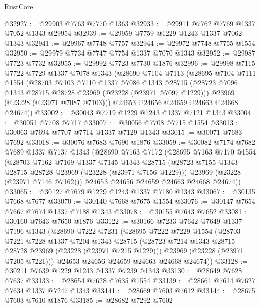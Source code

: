 \begin{lexlean}{RustCore}
\begin{coremodule}
@32927 := @29903 @7763 @7770 @1363
@32933 := @29911 @7762 @7769 @1337 @7052 @1343 @29954
@32939 := @29959 @7759 @1229 @1243 @1337 @7062 @1343
@32941 := @29967 @7748 @7757
@32944 := @29972 @7748 @7755 @1554
@32950 := @29979 @7734 @7747 @7754 @1337 @7070 @1343
@32952 := @29987 @7723 @7732
@32955 := @29992 @7723 @7730 @1876
@32996 := @29998
    @7115
    @7722
    @7729
    @1337
    @7078
    @1343
    (@28690
      @7104
      @7113
      (@28695
        @7104
        @7111
        @1554
        (@28703
          @7103
          @7110
          @1337
          @7086
          @1343
          @28715
          (@28723 @7096 @1343 @28715 @28728 @23969 (@23228 (@23971 @7097 @1229)))
          @23969
          (@23228 (@23971 @7087 @7103)))
        @24653
        @24656
        @24659
        @24663
        @24668
        @24674))
@33002 := @30043 @7719 @1229 @1243 @1337 @7121 @1343
@33004 := @30051 @7708 @7717
@33007 := @30056 @7708 @7715 @1554
@33013 := @30063 @7694 @7707 @7714 @1337 @7129 @1343
@33015 := @30071 @7683 @7692
@33018 := @30076 @7683 @7690 @1876
@33059 := @30082
    @7174
    @7682
    @7689
    @1337
    @7137
    @1343
    (@28690
      @7163
      @7172
      (@28695
        @7163
        @7170
        @1554
        (@28703
          @7162
          @7169
          @1337
          @7145
          @1343
          @28715
          (@28723 @7155 @1343 @28715 @28728 @23969 (@23228 (@23971 @7156 @1229)))
          @23969
          (@23228 (@23971 @7146 @7162)))
        @24653
        @24656
        @24659
        @24663
        @24668
        @24674))
@33065 := @30127 @7679 @1229 @1243 @1337 @7180 @1343
@33067 := @30135 @7668 @7677
@33070 := @30140 @7668 @7675 @1554
@33076 := @30147 @7654 @7667 @7674 @1337 @7188 @1343
@33078 := @30155 @7643 @7652
@33081 := @30160 @7643 @7650 @1876
@33122 := @30166
    @7233
    @7642
    @7649
    @1337
    @7196
    @1343
    (@28690
      @7222
      @7231
      (@28695
        @7222
        @7229
        @1554
        (@28703
          @7221
          @7228
          @1337
          @7204
          @1343
          @28715
          (@28723 @7214 @1343 @28715 @28728 @23969 (@23228 (@23971 @7215 @1229)))
          @23969
          (@23228 (@23971 @7205 @7221)))
        @24653
        @24656
        @24659
        @24663
        @24668
        @24674))
@33128 := @30211 @7639 @1229 @1243 @1337 @7239 @1343
@33130 := @28649 @7628 @7637
@33133 := @28654 @7628 @7635 @1554
@33139 := @28661 @7614 @7627 @7634 @1337 @7247 @1343
@33141 := @28669 @7603 @7612
@33144 := @28675 @7603 @7610 @1876
@33185 := @28682
    @7292
    @7602

\end{coremodule}
\end{lexlean}
